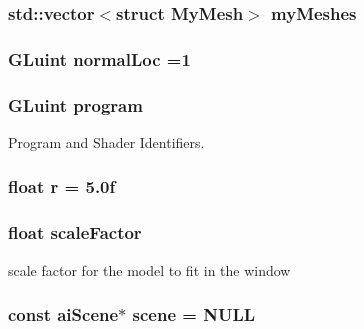 \hypertarget{model_8cu_a6c07ad8099da4a08eb875a7a2f98e5c1}{
\subsubsection[{my\-Meshes}]{\setlength{\rightskip}{0pt plus 5cm}std\-::vector$<$struct {\bf My\-Mesh}$>$ my\-Meshes}}\label{model_8cu_a6c07ad8099da4a08eb875a7a2f98e5c1}
\hypertarget{model_8cu_a56e36f00ac5f661588ac29611cfce147}{
\subsubsection[{normal\-Loc}]{\setlength{\rightskip}{0pt plus 5cm}G\-Luint normal\-Loc =1}}\label{model_8cu_a56e36f00ac5f661588ac29611cfce147}
\hypertarget{model_8cu_a27d8510c93324412d38a888eddee2852}{
\subsubsection[{program}]{\setlength{\rightskip}{0pt plus 5cm}G\-Luint program}}\label{model_8cu_a27d8510c93324412d38a888eddee2852}


Program and Shader Identifiers. 

\hypertarget{model_8cu_a4788d82c901b9367dd5c0daff8a7616b}{
\subsubsection[{r}]{\setlength{\rightskip}{0pt plus 5cm}float r = 5.\-0f}}\label{model_8cu_a4788d82c901b9367dd5c0daff8a7616b}
\hypertarget{model_8cu_a8030f24154c0e29bcbdf9a153804f214}{
\subsubsection[{scale\-Factor}]{\setlength{\rightskip}{0pt plus 5cm}float scale\-Factor}}\label{model_8cu_a8030f24154c0e29bcbdf9a153804f214}


scale factor for the model to fit in the window 

\hypertarget{model_8cu_a7146d7f6682223a83b571071845d75e9}{
\subsubsection[{scene}]{\setlength{\rightskip}{0pt plus 5cm}const ai\-Scene$\ast$ scene = N\-U\-L\-L}}\label{model_8cu_a7146d7f6682223a83b571071845d75e9}


